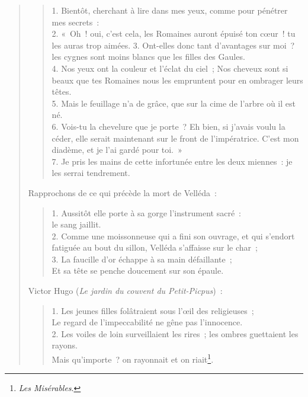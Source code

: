 \documentclass[french,twoside]{book} %
\begin{document}
\begin{verse}
\begin{verse}
1. Bientôt, cherchant à lire dans mes yeux, comme pour pénétrer mes secrets :\\
2. « Oh ! oui, c’est cela, les Romaines auront épuisé ton cœur ! tu les auras trop aimées. 3. Ont-elles donc tant d’avantages sur moi ? les cygnes sont moins blancs que les filles des Gaules.\\
4. Nos yeux ont la couleur et l’éclat du ciel ; Nos cheveux sont si beaux que tes Romaines nous les empruntent pour en ombrager leurs têtes.\\
5. Mais le feuillage n’a de grâce, que sur la cime de l’arbre où il est né.\\
6. Vois-tu la chevelure que je porte ? Eh bien, si j’avais voulu la céder, elle serait maintenant sur le front de l’impératrice. C’est mon diadème, et je l’ai gardé pour toi. »\\
7. Je pris les mains de cette infortunée entre les deux miennes : je les serrai tendrement.\\
\end{verse}

\noindent Rapprochons de ce qui précède la mort de Velléda :\par


\begin{verse}
1. Aussitôt elle porte à sa gorge l’instrument sacré :\\
le sang jaillit.\\
2. Comme une moissonneuse qui a fini son ouvrage, et qui s’endort fatiguée au bout du sillon, Velléda s’affaisse sur le char ;\\
3. La faucille d’or échappe à sa main défaillante ;\\
Et sa tête se penche doucement sur son épaule.\\
\end{verse}

\noindent Victor Hugo (\emph{Le jardin du couvent du Petit-Picpus}) :\par


\begin{verse}
1. Les jeunes filles folâtraient sous l’œil des religieuses ;\\
Le regard de l’impeccabilité ne gêne pas l’innocence.\\
2. Les voiles de loin surveillaient les rires ; les ombres guettaient les rayons.\\
Mais qu’importe ? on rayonnait et on riait\footnote{\emph{Les Misérables}.}.\\
\end{verse}


\end{verse}
\end{document}
